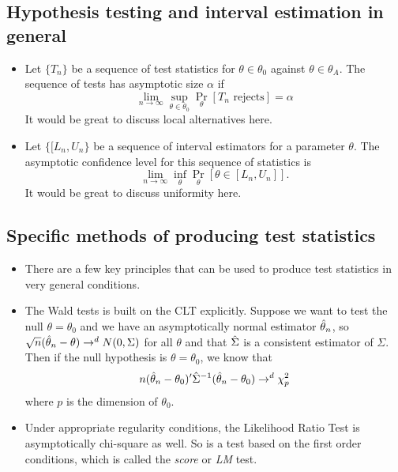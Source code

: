 \subsection{Hypothesis testing and interval estimation in general}

\begin{itemize}

\item Let $\{T_n\}$ be a sequence of test statistics for $\theta \in \theta_0$
  against $\theta \in \theta_A$.  The sequence of tests has asymptotic size $\alpha$ if
  \begin{equation*}
    \lim_{n \to \infty} \sup_{\theta \in \theta_0} \Pr_\theta[T_n \text{ rejects}] = \alpha
  \end{equation*}
  It would be great to discuss local alternatives here.

\item Let $\{[L_n, U_n\}$ be a sequence of interval estimators for a
  parameter $\theta$.  The asymptotic confidence level for this sequence of
  statistics is
  \begin{equation*}
    \lim_{n \to \infty} \inf_\theta \Pr_{\theta}[\theta \in [L_n, U_n]].
  \end{equation*}
  It would be great to discuss uniformity here.

\end{itemize}

\subsection{Specific methods of producing test statistics}

\begin{itemize}

\item There are a few key principles that can be used to produce test
  statistics in very general conditions.

\item The Wald tests is built on the CLT explicitly.  Suppose we want
  to test the null $\theta = \theta_0$ and we have an asymptotically normal
  estimator $\hat{\theta}_n$, so $\sqrt{n} (\hat{\theta}_n - \theta) \to^d N(0,\Sigma)$ for all $\theta$
  and that $\hat{\Sigma}$ is a consistent estimator of $\Sigma$.  Then if the null
  hypothesis is $\theta = \theta_0$, we know that
  \begin{equation*}
    n (\hat{\theta}_n - \theta_0)' \hat{\Sigma}^{-1} (\hat{\theta}_n - \theta_0) \to^d \chi^2_p
  \end{equation*}
  where $p$ is the dimension of $\theta_0$.

\item Under appropriate regularity conditions, the Likelihood Ratio
  Test is asymptotically chi-square as well.  So is a test based on
  the first order conditions, which is called the \emph{score} or
  \emph{LM} test.

\end{itemize}

